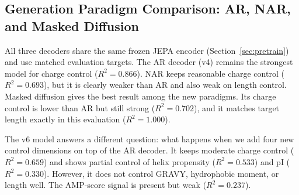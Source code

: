 \subsection{Generation Paradigm Comparison: AR, NAR, and Masked Diffusion}
\label{sec:res_gen_paradigm}

\begin{table}[h]
\centering
\caption{Comparison of generation settings built on the same frozen JEPA encoder.
  AR v4 is the main 3-condition baseline.
  NAR and masked diffusion test new generation paradigms with the same
  3-condition target.
  AR v6 keeps the AR decoder but extends conditioning from 3 to 7 properties.
  Novelty = fraction of generated sequences with no exact match to the
  868k training corpus.}
\label{tab:gen_comparison}
\end{table}

All three decoders share the same frozen JEPA encoder (Section~\ref{sec:pretrain})
and use matched evaluation targets.
The AR decoder (v4) remains the strongest model for charge control
($R^2{=}0.866$).
NAR keeps reasonable charge control ($R^2{=}0.693$), but it is clearly weaker
than AR and also weak on length control.
Masked diffusion gives the best result among the new paradigms.
Its charge control is lower than AR but still strong ($R^2{=}0.702$), and it
matches target length exactly in this evaluation ($R^2{=}1.000$).

The v6 model answers a different question: what happens when we add four new
control dimensions on top of the AR decoder.
It keeps moderate charge control ($R^2{=}0.659$) and shows partial control of
helix propensity ($R^2{=}0.533$) and pI ($R^2{=}0.330$).
However, it does not control GRAVY, hydrophobic moment, or length well.
The AMP-score signal is present but weak ($R^2{=}0.237$).


